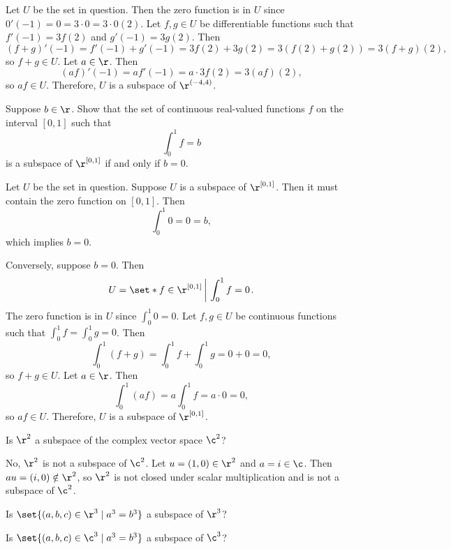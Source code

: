 \begin{sol}
    Let $U$ be the set in question. Then the zero function is in $U$ since $0'(-1) = 0 = 3 \cdot 0 = 3 \cdot 0(2)$. Let $f, g \in U$ be differentiable functions such that $f'(-1) = 3f(2)$ and $g'(-1) = 3g(2)$. Then
    \[(f + g)'(-1) = f'(-1) + g'(-1) = 3f(2) + 3g(2) = 3(f(2) + g(2)) = 3(f + g)(2),\]
    so $f + g \in U$. Let $a \in \r$. Then
    \[(af)'(-1) = a f'(-1) = a \cdot 3f(2) = 3(af)(2),\]
    so $af \in U$. Therefore, $U$ is a subspace of $\r^{(-4, 4)}$.
\end{sol}

\begin{exercise}[1c4]
    Suppose $b \in \r$. Show that the set of continuous real-valued functions $f$ on the interval $[0, 1]$ such that
    \[\int_0^1 f = b\]
    is a subspace of $\r^{[0, 1]}$ if and only if $b = 0$.
\end{exercise}

\begin{sol}
    Let $U$ be the set in question. Suppose $U$ is a subspace of $\r^{[0, 1]}$. Then it must contain the zero function on $[0, 1]$. Then
    \[\int_0^1 0 = 0 = b,\]
    which implies $b = 0$.

    Conversely, suppose $b = 0$. Then
    \[U = \set*{f \in \r^{[0, 1]}\left|~\int_0^1 f = 0\right.}.\]
    The zero function is in $U$ since $\int_0^1 0 = 0$. Let $f, g \in U$ be continuous functions such that $\int_0^1 f = \int_0^1 g = 0$. Then
    \[\int_0^1 (f + g) = \int_0^1 f + \int_0^1 g = 0 + 0 = 0,\]
    so $f + g \in U$. Let $a \in \r$. Then
    \[\int_0^1 (af) = a \int_0^1 f = a \cdot 0 = 0,\]
    so $af \in U$. Therefore, $U$ is a subspace of $\r^{[0, 1]}$.
\end{sol}

\begin{exercise}[1c5]
    Is $\r^2$ a subspace of the complex vector space $\c^2$?
\end{exercise}

\begin{sol}
    No, $\r^2$ is not a subspace of $\c^2$. Let $u = (1, 0) \in \r^2$ and $a = i \in \c$. Then $au = (i, 0) \notin \r^2$, so $\r^2$ is not closed under scalar multiplication and is not a subspace of $\c^2$.
\end{sol}

\begin{exercise}[1c6]
    \begin{subexercises}
        \item Is $\set{(a, b, c) \in \r^3 \mid a^3 = b^3}$ a subspace of $\r^3$?
        \item Is $\set{(a, b, c) \in \c^3 \mid a^3 = b^3}$ a subspace of $\c^3$?
    \end{subexercises}
\end{exercise}

